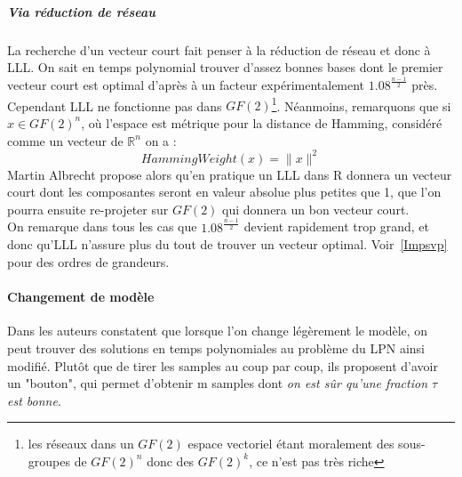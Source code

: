 \documentclass{article}		%
\theoremstyle{definition}
\theoremstyle{plain}
\theoremstyle{plain}
\theoremstyle{plain}
\theoremstyle{plain}
\begin{document}
\subparagraph{Via réduction de réseau} 
La recherche d'un vecteur court fait penser à la réduction de réseau et
donc à LLL. On sait en temps polynomial trouver d'assez bonnes bases dont
le premier vecteur court est optimal d'après \cite{Phong} à un facteur expérimentalement
$1.08^{\frac {n-1} 2}$ près.
Cependant LLL ne fonctionne pas dans $GF(2)$\footnote{les réseaux dans un
$GF(2)$ espace vectoriel étant moralement des sous-groupes de $GF(2)^n$
donc des $GF(2)^k$, ce n'est pas très riche}. Néanmoins, remarquons que
si 
 $x\in GF(2)^n$, où l'espace est métrique pour la distance de Hamming, considéré comme un vecteur de $\mathbb{R}^n$ on a :
$$HammingWeight(x)=\| x \| ^2$$  
 Martin Albrecht propose alors qu'en pratique un LLL dans R donnera un
vecteur court dont les composantes seront en valeur absolue plus petites
que 1, que l'on pourra ensuite re-projeter sur $GF(2)$ qui donnera un bon
vecteur court.
\\
On remarque dans tous les cas que $1.08^{\frac {n-1} {2}}$ devient
rapidement trop grand, et donc qu'LLL n'assure plus du tout de trouver un
vecteur optimal. Voir~\ref{Impsvp} pour des ordres de grandeurs.

\paragraph{Changement de modèle}

 Dans \cite{Arora} les auteurs constatent
que lorsque l'on change légèrement le modèle, on peut trouver des
solutions en temps polynomiales au problème du LPN ainsi modifié. Plutôt que de tirer les samples au coup par coup,
ils proposent d'avoir un "bouton", qui permet d'obtenir m samples dont
\emph{on
est sûr qu'une fraction $\tau$ est bonne}.
\end{document}
